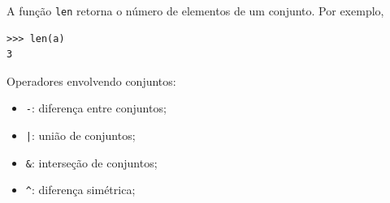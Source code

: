 \documentclass[12pt]{article}
\begin{document}
\begin{obs}
  A função {\python} \lstinline+len+ retorna o número de elementos de um conjunto. Por exemplo,
  
\begin{lstlisting}
>>> len(a)
3
\end{lstlisting}

\end{obs}

Operadores envolvendo conjuntos:
\begin{itemize}
\item[] \lstinline+-+: diferença entre conjuntos;
\item[] \lstinline+|+: união de conjuntos;
\item[] \lstinline+&+: interseção de conjuntos;
\item[] \lstinline+^+: diferença simétrica;
\end{itemize}
\end{document}
